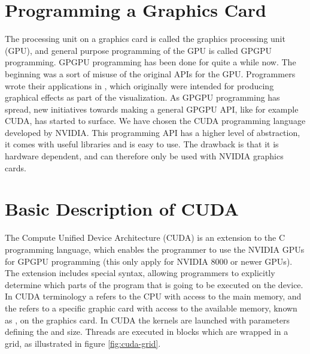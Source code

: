 \section{Programming a Graphics Card}
The processing unit on a graphics card is called the graphics
processing unit (GPU), and general purpose programming of the GPU is
called GPGPU programming.
%
GPGPU programming has been done for quite a while now. The beginning was
a sort of misuse of the original APIs for the GPU. Programmers wrote
their applications in , which originally were intended
for producing graphical effects as part of the visualization.
%
As GPGPU programming has spread, new initiatives towards making a
general GPGPU API, like for example CUDA, has started to surface.
%
%
%
We have chosen the CUDA programming language
developed by NVIDIA. This programming API has a higher level of
abstraction, it comes with useful libraries and is easy to use. The
drawback is that it is hardware dependent, and can therefore only be
used with NVIDIA graphics cards.

\layoutnewpage

\section{Basic Description of CUDA}
The Compute Unified Device Architecture (CUDA) is an
extension to the C programming language, which enables the programmer
to use the NVIDIA GPUs for GPGPU programming (this only apply for
NVIDIA 8000 or newer GPUs).
%
The extension includes special syntax, allowing programmers to
explicitly determine which parts of the program that is going to be
executed on the device. 
%
In CUDA terminology a  refers to the CPU with access to the main
memory, and the  refers to a specific graphic card with access
to the available memory, known as , on the graphics card.
%
%
In CUDA the kernels are launched with parameters defining the
 and  size. Threads are executed in
blocks which are wrapped in a grid,
as illustrated in figure \vref{fig:cuda-grid}.

